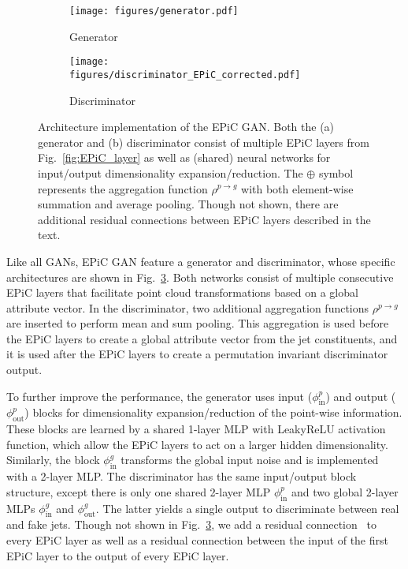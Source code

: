 \documentclass[a4paper,submission, Phys]{SciPost}
\DeclareRobustCommand{\Fig}[1]{Fig.~\ref{fig:#1}}
\begin{document}
\begin{figure}[tbp]
\centering
    \begin{subfigure}[b]{0.7\textwidth}
         \centering
         \texttt{[image: figures/generator.pdf]}
         \caption{Generator}
         \label{fig:generator}
    \end{subfigure}
        
    \vspace{0.5cm}

    \begin{subfigure}[b]{0.9\textwidth}
         \centering
         \texttt{[image: figures/discriminator\_EPiC\_corrected.pdf]}
         \caption{Discriminator}
         \label{fig:discriminator}
    \end{subfigure}
\caption{
%
Architecture implementation of the EPiC GAN.
%
Both the (a) generator and (b) discriminator consist of multiple EPiC layers from \Fig{EPiC_layer} as well as (shared) neural networks for input/output dimensionality expansion/reduction.
%
The $\oplus$ symbol represents the aggregation function $\rho^{p \rightarrow g}$ with both element-wise summation and average pooling.
%
Though not shown, there are additional residual connections between EPiC layers described in the text. 
}
\label{fig:GAN_diagram}
\end{figure}

Like all GANs, EPiC GAN feature a generator and discriminator, whose specific architectures are shown in \Fig{GAN_diagram}.
%
Both networks consist of multiple consecutive EPiC layers that facilitate point cloud transformations based on a global attribute vector.
%
In the discriminator, two additional aggregation functions $\rho^{p\to g}$ are inserted to perform mean and sum pooling.
%
This aggregation is used before the EPiC layers to create a global attribute vector from the jet constituents, and it is used after the EPiC layers to create a permutation invariant discriminator output.


To further improve the performance, the generator uses input ($\phi_\mathrm{in}^p$) and output ($\phi_\mathrm{out}^p$) blocks for dimensionality expansion/reduction of the point-wise information.
%
These blocks are learned by a shared 1-layer MLP with LeakyReLU activation function, which allow the EPiC layers to act on a larger hidden dimensionality.
%
Similarly, the block $\phi^g_\mathrm{in}$ transforms the global input noise and is implemented with a 2-layer MLP.
%
The discriminator has the same input/output block structure, except there is only one shared 2-layer MLP $\phi^p_\mathrm{in}$ and two global 2-layer MLPs $\phi^g_\mathrm{in}$ and $\phi^g_\mathrm{out}$. 
%
The latter yields a single output to discriminate between real and fake jets.
%
Though not shown in \Fig{GAN_diagram}, we add a residual connection~\cite{ResNet_1512.03385} to every EPiC layer as well as a residual connection between the input of the first EPiC layer to the output of every EPiC layer.
\end{document}
